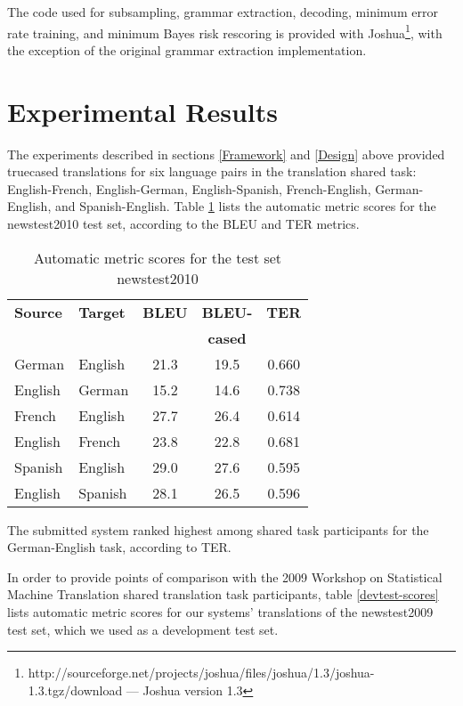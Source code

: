 \documentclass[11pt]{article}
\begin{document}
The code used for subsampling, grammar extraction, decoding, minimum error rate training, and minimum Bayes risk rescoring is provided with Joshua\footnote{http://sourceforge.net/projects/joshua/files/joshua/1.3/joshua-1.3.tgz/download --- Joshua version 1.3}, with the exception of the original \cite{Lopez2008} grammar extraction implementation.










\section{Experimental Results}
\label{Results}

The experiments described in sections \ref{Framework} and \ref{Design} above provided truecased translations for six language pairs in the translation shared task: English-French, English-German, English-Spanish, French-English, German-English, and Spanish-English. Table \ref{scores} lists the automatic metric scores for the newstest2010 test set, according to the BLEU \cite{Papineni2002} and TER \cite{TER} metrics. 

\begin{table}[h]
\begin{center}
\begin{tabular}{|l|l||c|c|c|}
\hline
\bf Source & \bf Target & \bf BLEU & \bf BLEU- & \bf TER \\
& & & \bf cased & \\
\hline
German & English & 21.3 & 19.5 & 0.660 \\ \hline
English & German & 15.2  & 14.6  & 0.738 \\ \hline
French & English & 27.7 & 26.4 & 0.614 \\ \hline
English & French & 23.8 & 22.8 & 0.681 \\ \hline
Spanish & English & 29.0 & 27.6 & 0.595 \\ \hline
English & Spanish & 28.1 & 26.5 & 0.596  \\ \hline
\end{tabular}
\end{center}
\caption{\label{scores} Automatic metric scores for the test set newstest2010 }
\end{table}

The submitted system ranked highest among shared task participants for the German-English task, according to TER.

In order to provide points of comparison with the 2009 Workshop on Statistical Machine Translation shared translation task participants,  table \ref{devtest-scores} lists automatic metric scores for our systems' translations of the newstest2009 test set, which we used as a development test set.
\end{document}
